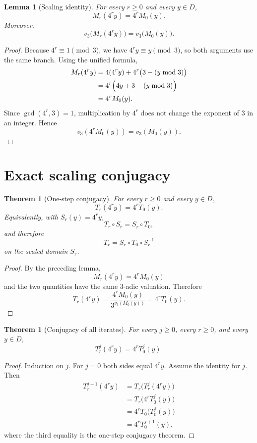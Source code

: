 \documentclass[11pt]{article}
\newtheorem{lemma}[definition]{Lemma}
\newtheorem{theorem}[definition]{Theorem}
\begin{document}
\begin{lemma}[Scaling identity]
For every $r\ge0$ and every $y\in D$,
\[
M_r(4^ry)=4^rM_0(y).
\]
Moreover,
\[
v_3\bigl(M_r(4^ry)\bigr)=v_3\bigl(M_0(y)\bigr).
\]
\end{lemma}
\begin{proof}
Because $4^r\equiv1\pmod3$, we have $4^ry\equiv y\pmod3$, so both arguments use the same branch. Using the unified formula,
\[
\begin{aligned}
M_r(4^ry)
&=4(4^ry)+4^r\bigl(3-(y\bmod3)\bigr)\\
&=4^r\Bigl(4y+3-(y\bmod3)\Bigr)\\
&=4^rM_0(y).
\end{aligned}
\]
Since $\gcd(4^r,3)=1$, multiplication by $4^r$ does not change the exponent of $3$ in an integer. Hence
\[
v_3(4^rM_0(y))=v_3(M_0(y)).
\]
\end{proof}

\section{Exact scaling conjugacy}
\begin{theorem}[One-step conjugacy]
For every $r\ge0$ and every $y\in D$,
\[
T_r(4^ry)=4^rT_0(y).
\]
Equivalently, with $S_r(y)=4^ry$,
\[
T_r\circ S_r=S_r\circ T_0,
\]
and therefore
\[
T_r=S_r\circ T_0\circ S_r^{-1}
\]
on the scaled domain $S_r$.
\end{theorem}
\begin{proof}
By the preceding lemma,
\[
M_r(4^ry)=4^rM_0(y)
\]
and the two quantities have the same $3$-adic valuation. Therefore
\[
T_r(4^ry)
=\frac{4^rM_0(y)}{3^{v_3(M_0(y))}}
=4^rT_0(y).
\]
\end{proof}

\begin{theorem}[Conjugacy of all iterates]
For every $j\ge0$, every $r\ge0$, and every $y\in D$,
\[
T_r^j(4^ry)=4^rT_0^j(y).
\]
\end{theorem}
\begin{proof}
Induction on $j$. For $j=0$ both sides equal $4^ry$. Assume the identity for $j$. Then
\[
\begin{aligned}
T_r^{j+1}(4^ry)
&=T_r\bigl(T_r^j(4^ry)\bigr)\\
&=T_r\bigl(4^rT_0^j(y)\bigr)\\
&=4^rT_0\bigl(T_0^j(y)\bigr)\\
&=4^rT_0^{j+1}(y),
\end{aligned}
\]
where the third equality is the one-step conjugacy theorem.\end{proof}
\end{document}
